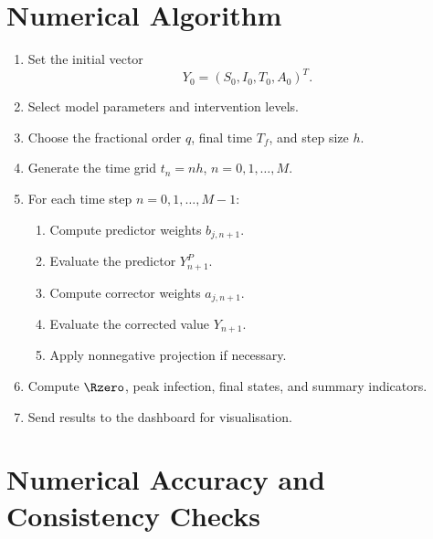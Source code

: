 \section{Numerical Algorithm}

\begin{resultbox}[title={Algorithm: Fractional ABM Simulation for the SITA Model}]
\begin{enumerate}
  \item Set the initial vector
  \[
  Y_0=(S_0,I_0,T_0,A_0)^T.
  \]
  \item Select model parameters and intervention levels.
  \item Choose the fractional order $q$, final time $T_f$, and step size $h$.
  \item Generate the time grid $t_n=nh$, $n=0,1,\ldots,M$.
  \item For each time step $n=0,1,\ldots,M-1$:
  \begin{enumerate}
    \item Compute predictor weights $b_{j,n+1}$.
    \item Evaluate the predictor $Y_{n+1}^{P}$.
    \item Compute corrector weights $a_{j,n+1}$.
    \item Evaluate the corrected value $Y_{n+1}$.
    \item Apply nonnegative projection if necessary.
  \end{enumerate}
  \item Compute $\Rzero$, peak infection, final states, and summary indicators.
  \item Send results to the dashboard for visualisation.
\end{enumerate}
\end{resultbox}

\section{Numerical Accuracy and Consistency Checks}

